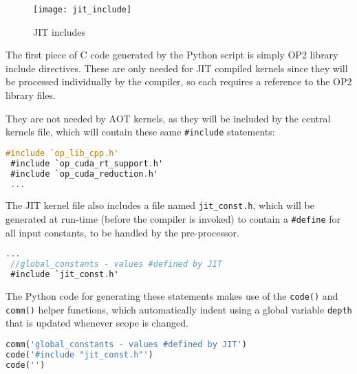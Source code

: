 \clearpage
%
\begin{wrapfigure}[16]{r}{.33\textwidth}
  \centering
  \caption{JIT includes}
  \label{fig:jit_include}
  \texttt{[image: jit\_include]}
\end{wrapfigure}
The first piece of C code generated by the Python script is simply OP2 library include directives. These are only needed for JIT compiled kernels since they will be processed individually by the compiler, so each requires a reference to the OP2 library files.
\par
They are not needed by AOT kernels, as they will be included by the central kernels file, which will contain these same \verb|#include| statements:
\begin{lstlisting}[backgroundcolor = \color{green!20}, language=C]
 #include `op_lib_cpp.h'
 #include `op_cuda_rt_support.h'
 #include `op_cuda_reduction.h'
 ...
\end{lstlisting}

The JIT kernel file also includes a file named \verb|jit_const.h|, which will be generated at run-time (before the compiler is invoked) to contain a \verb|#define| for all input constants, to be handled by the pre-processor.
\begin{lstlisting}[backgroundcolor = \color{green!20}, language=C]
 ...
 //global_constants - values #defined by JIT
 #include `jit_const.h'
\end{lstlisting}

\noindent The Python code for generating these statements makes use of the \verb|code()| and \verb|comm()| helper functions, which automatically indent using a global variable \verb|depth| that is updated whenever scope is changed.

\begin{lstlisting}[backgroundcolor = \color{lightgray!20}, language=Python]
comm('global_constants - values #defined by JIT')
code('#include "jit_const.h"')
code('')
\end{lstlisting}

\clearpage

